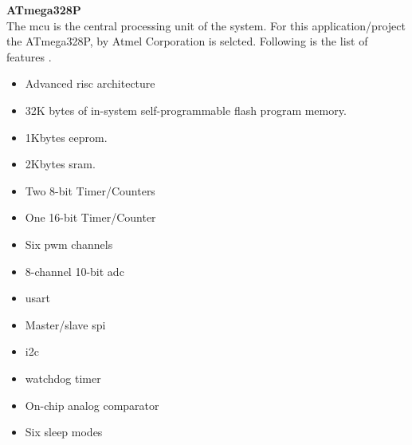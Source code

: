 	\textbf{ATmega328P}\\
	 
	   The \gls{mcu} is the central processing unit of the system. For this application/project the ATmega328P, by Atmel Corporation is selcted. Following is the list of features \cite{AtMega328P}.
	 
	 \begin{itemize}
		\item Advanced \gls{risc} architecture
		\item 32K bytes of in-system self-programmable flash program memory.
		\item 1Kbytes \gls{eeprom}.
		\item 2Kbytes \gls{sram}.
		\item Two 8-bit Timer/Counters
		\item One 16-bit Timer/Counter
		\item Six \gls{pwm} channels
		\item 8-channel 10-bit \gls{adc}
		\item \gls{usart}
		\item Master/slave \gls{spi}
		\item \gls{i2c}
		\item watchdog timer
		\item On-chip analog comparator
		\item Six sleep modes 
			
			
		
		
	\end{itemize}	  
	 
